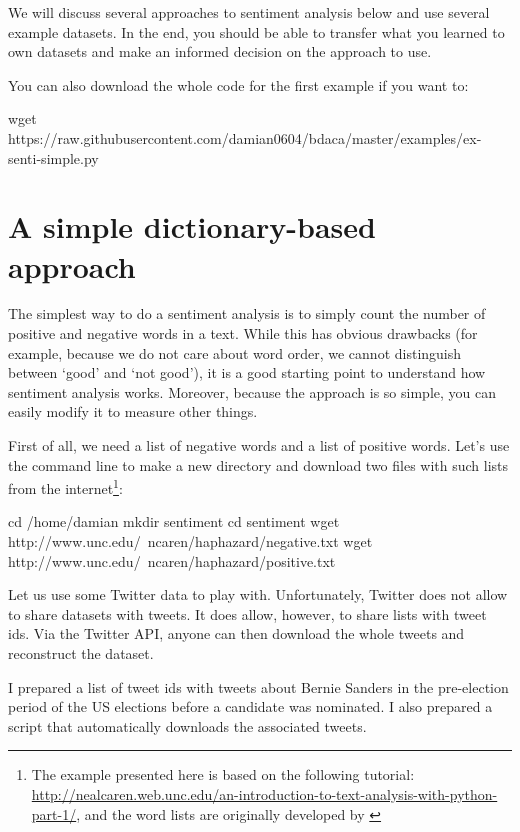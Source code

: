 \documentclass[a4paper,12pt]{book}
\begin{document}
We will discuss several approaches to sentiment analysis below and use several example datasets. In the end, you should be able to transfer what you learned to own datasets and make an informed decision on the approach to use.


You can also download the whole code for the first example if you want to:

\begin{lstlistingbash}
wget https://raw.githubusercontent.com/damian0604/bdaca/master/examples/ex-senti-simple.py
\end{lstlistingbash}


\section{A simple dictionary-based approach}
\label{simplesent}

The simplest way to do a sentiment analysis is to simply count the number of positive and negative words in a text. While this has obvious drawbacks (for example, because we do not care about word order, we cannot distinguish between `good' and `not good'), it is a good starting point to understand how sentiment analysis works. Moreover, because the approach is so simple, you can easily modify it to measure other things.

First of all, we need a list of negative words and a list of positive words. Let's use the command line to make a new directory and download two files with such lists from the internet\footnote{The example presented here is based on the following tutorial: \url{http://nealcaren.web.unc.edu/an-introduction-to-text-analysis-with-python-part-1/}, and the word lists are originally developed by \cite{Wilson2005}}:

\begin{lstlistingbash}
cd /home/damian
mkdir sentiment
cd sentiment
wget http://www.unc.edu/~ncaren/haphazard/negative.txt
wget http://www.unc.edu/~ncaren/haphazard/positive.txt
\end{lstlistingbash}


Let us use some Twitter data to play with. Unfortunately, Twitter does not allow to share datasets with tweets. It does allow, however, to share lists with tweet ids. Via the Twitter API, anyone can then download the whole tweets and reconstruct the dataset.

I prepared a list of tweet ids with tweets about Bernie Sanders in the pre-election period of the US elections before a candidate was nominated. I also prepared a script that automatically downloads the associated tweets.
\end{document}
